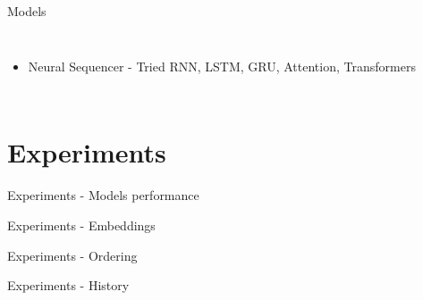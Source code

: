 \documentclass{beamer}
\begin{document}
\begin{frame}{Models}
\begin{columns}[c]
\begin{itemize}
    \item Neural Sequencer - Tried RNN, LSTM, GRU, Attention, Transformers
\end{itemize}
\end{columns}

\end{frame}



\section{Experiments}
\begin{frame}{Experiments - Models performance}

\end{frame}

\begin{frame}{Experiments - Embeddings}

\end{frame}

\begin{frame}{Experiments - Ordering}

\end{frame}

\begin{frame}{Experiments - History}

\end{frame}
\end{document}
